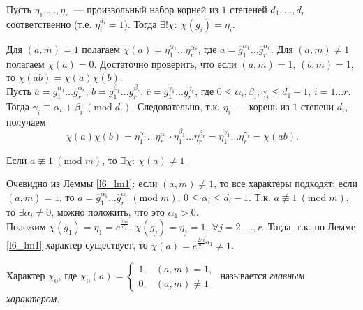 \begin{lemma} \label{l6_lm1}
	Пусть $\eta_1, \dots, \eta_r$ — произвольный набор корней из $1$ степеней $d_1, \dots, d_r$ соответственно (т.е. $\eta_i^{d_i} = 1$).
	Тогда $\exists! \chi: \ \chi(g_i) = \eta_i$.
\end{lemma}
\begin{pf}
	Для $(a,m)=1$ полагаем $\chi(a) = \eta_1^{\alpha_1} \dots \eta_r^{\alpha_r}$, где $\overline{a} = \overline{g}_1^{\alpha_1} \dots \overline{g}_r^{\alpha_r}$. Для $(a,m) \ne 1$ полагаем $\chi(a) = 0$. Достаточно проверить, что если
	$(a,m)=1, \, (b,m)=1$, то $\chi(ab) = \chi(a)\chi(b)$.\\
	Пусть $\overline{a} = \overline{g}_1^{\alpha_1} \dots \overline{g}_r^{\alpha_r}, \, \overline{b} = \overline{g}_1^{\beta_1} \dots \overline{g}_r^{\beta_r}, \, \overline{c} = \overline{g}_1^{\gamma_1} \dots \overline{g}_r^{\gamma_r}$, где $0 \leq \alpha_i, \beta_i, \gamma_i \leq d_1 - 1, \, i=1 \dots r$.
	Тогда $\gamma_i \equiv \alpha_i + \beta_i \ (\mathrm{mod} \; d_i)$. Следовательно, т.к. $\eta_i$ — корень из $1$ степени $d_i$, получаем
	$$\chi(a)\chi(b) = \eta_1^{\alpha_1} \dots \eta_r^{\alpha_r} \cdot \eta_1^{\beta_1} \dots \eta_r^{\beta_r} = \eta_1^{\gamma_1} \dots \eta_r^{\gamma_r} = \chi(ab).$$
\end{pf}

\begin{lemma} \label{l6_lm2}
	Если $a \not \equiv 1 \ (\mathrm{mod} \; m)$, то $\exists \chi: \ \chi(a) \ne 1$.
\end{lemma}
\begin{pf}
	Очевидно из Леммы \ref{l6_lm1}: если $(a,m) \ne 1$, то все характеры подходят; если $(a,m) = 1$, то $\overline{a}=\overline{g}_1^{\alpha_1} \dots \overline{g}_r^{\alpha_r} \ (\mathrm{mod} \; m), \, 0 \leq \alpha_i \leq d_i-1$. Т.к. $a \not\equiv 1 \ (\mathrm{mod} \; m)$, то $\exists \alpha_i \ne 0$, можно положить, что это $\alpha_1 > 0$.\\
	Положим $\chi\left( g_1 \right) = \eta_1 = e^{\frac{2\pi i}{d_1}}, \, \chi\left( g_j \right) = \eta_j = 1, \ \forall j = 2, \dots, r$.		Тогда, т.к. по Лемме \ref{l6_lm1} характер существует, то $\chi(a) = e^{\frac{2\pi i}{d_1}\alpha_1} \ne 1$.
\end{pf}

\begin{definition}
	Характер $\chi_0$, где $\chi_0(a) = \begin{cases}
		1, & (a,m)=1, \\
		0, & (a,m) \ne 1
	\end{cases}$ называется \textit{главным характером}.
\end{definition}

